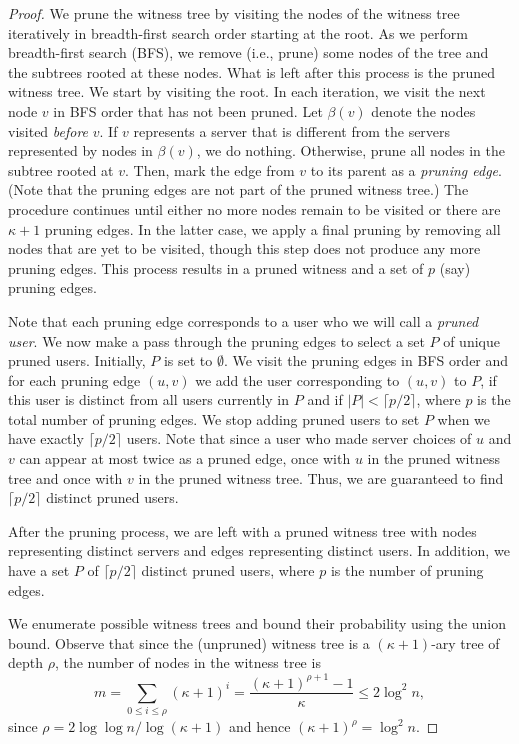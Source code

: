 \documentclass[conference]{IEEEtran}
\begin{document}
\begin{proof}
We prune the witness tree by visiting the nodes of the witness tree iteratively in breadth-first  search order starting at the root. As we perform breadth-first search (BFS), we remove (i.e., prune) some nodes of the tree and the subtrees rooted  at these nodes. What is left after this process is the pruned witness tree. We start by visiting the root. In each iteration, we visit the next  node $v$ in BFS order that has not been pruned. Let $\beta(v)$ denote the nodes visited {\it before\/} $v$. If $v$ represents a server that is different from the servers represented by nodes in $\beta(v)$, we do nothing.
 Otherwise, prune all nodes in the subtree rooted at $v$. Then, mark the edge from $v$ to its parent  as a {\em pruning edge}. (Note that the pruning edges are not part of the pruned witness tree.) The procedure continues until either no more nodes remain to be visited or there are $\kappa + 1$ pruning edges. In the latter case, we apply a final pruning by removing all nodes that are yet to be visited, though this step does not produce any more pruning edges. This process results in a pruned witness and a set of $p$ (say) pruning edges.  

 Note that each pruning edge corresponds to a user who we will call a {\em pruned user}. We now make a pass through the pruning edges to select a set $P$ of unique pruned users. Initially, $P$ is set to $\emptyset$. We visit the pruning edges in BFS order and for each pruning edge $(u,v)$ we add the user corresponding to $(u,v)$ to $P$, if this user is distinct from all users currently in $P$ and if $|P|<  \lceil p /2 \rceil $, where $p$ is the total number of pruning edges. We stop adding pruned users to set $P$ when we have exactly $\lceil p/2 \rceil$  users. Note that since a user who made server choices of $u$ and $v$ can appear at most twice as a pruned edge, once with $u$ in the pruned witness tree and once with $v$ in the pruned witness tree. Thus, we are guaranteed to find $\lceil p/2 \rceil$ distinct pruned users. 
 
After the pruning process, we are left with a pruned witness tree with nodes representing distinct servers and edges representing distinct users. In addition, we have a set $P$ of $\lceil p/2 \rceil$ distinct pruned users, where $p$ is the number of pruning edges. 

We enumerate possible witness trees and bound their probability using the union bound. Observe that since the (unpruned) witness tree is a $(\kappa + 1)$-ary tree of depth $\rho$, the number of nodes in the witness tree is 
\begin{equation}
m = \sum_{0 \leq i \leq \rho} (\kappa + 1)^i =  \frac{(\kappa+1)^{\rho + 1} - 1}{\kappa} \leq 2 \log^2 n, \label{eq:mbound}
\end{equation}
since $\rho = 2 \log\log n / \log (\kappa + 1)$ and hence $(\kappa + 1)^\rho = \log^2 n$.


\end{proof}
\end{document}
